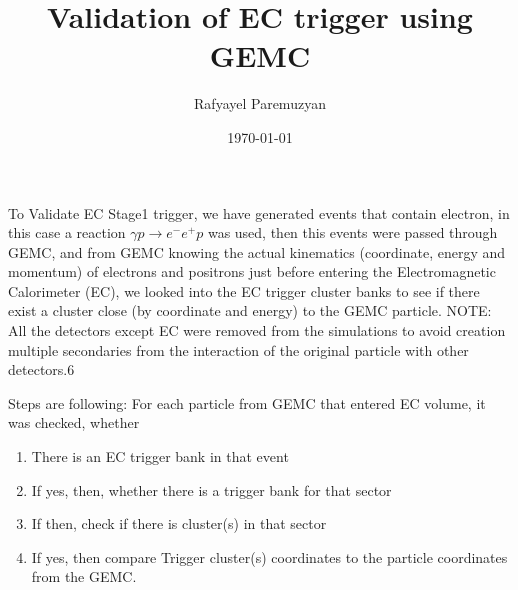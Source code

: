 \documentclass[letterpaper,12pt]{article}
\title{Validation of EC trigger using GEMC}
\date \today
\author{Rafyayel Paremuzyan}
\begin{document}
 \maketitle
 To Validate EC Stage1 trigger, we have generated events that contain electron, in this case a reaction $\gamma p \rightarrow e^{-}e^{+}p$ was used, then this events
 were passed through GEMC, and from GEMC knowing the actual kinematics (coordinate, energy and momentum) of electrons and positrons just before entering the Electromagnetic 
 Calorimeter (EC), we looked into the EC trigger cluster banks to see if there exist a cluster close (by coordinate and energy) to the GEMC particle.
 NOTE: All the detectors except EC were removed from the simulations to avoid creation multiple secondaries from the interaction of the original particle with other detectors.6
 
 Steps are following: For each particle from GEMC that entered EC volume, it was checked, whether 
 \begin{enumerate}
  \item \label{enum:Steps_Trig_check} There is an EC trigger bank in that event
  \item \label{enum:Steps_Sect_check}If yes, then, whether there is a trigger bank for that sector
  \item \label{enum:Steps_Clust_check}If then, check if there is cluster(s) in that sector
  \item \label{enum:Steps_dthdphi_check}If yes, then compare Trigger cluster(s) coordinates to the particle coordinates from the GEMC.
 \end{enumerate}
\end{document}
